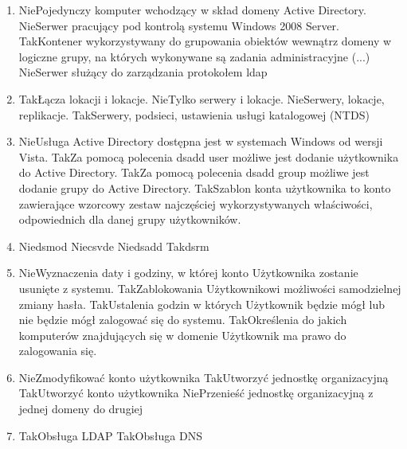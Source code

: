 \begin{enumerate}
		{Tak}{Dodać rolę Active Directory Domain Services.}%
		{Nie}{Zainstalować serwer DHCP.}
		\item {}%
		{Nie}{Pojedynczy komputer wchodzący w skład domeny Active Directory.}%
		{Nie}{Serwer pracujący pod kontrolą systemu Windows 2008 Server.}%
		{Tak}{Kontener wykorzystywany do grupowania obiektów wewnątrz domeny w logiczne grupy, na których wykonywane są zadania administracyjne (...)}%
		{Nie}{Serwer służący do zarządzania protokołem ldap}
		\item {}%
		{Tak}{Łącza lokacji i lokacje.}%
		{Nie}{Tylko serwery i lokacje.}%
		{Nie}{Serwery, lokacje, replikacje.}%
		{Tak}{Serwery, podsieci, ustawienia usługi katalogowej (NTDS)}
		\item {}%
		{Nie}{Usługa Active Directory dostępna jest w systemach Windows od wersji Vista.}%
		{Tak}{Za pomocą polecenia dsadd user możliwe jest dodanie użytkownika do Active Directory.}%
		{Tak}{Za pomocą polecenia dsadd group możliwe jest dodanie grupy do Active Directory.}%
		{Tak}{Szablon konta użytkownika to konto zawierające wzorcowy zestaw najczęściej wykorzystywanych właściwości, odpowiednich dla danej grupy użytkowników.}
		\item {}%
		{Nie}{dsmod}%
		{Nie}{csvde}%
		{Nie}{dsadd}%
		{Tak}{dsrm}
		\item {}%
		{Nie}{Wyznaczenia daty i godziny, w której konto Użytkownika zostanie usunięte z systemu.}%
		{Tak}{Zablokowania Użytkownikowi możliwości samodzielnej zmiany hasła.}%
		{Tak}{Ustalenia godzin w których Użytkownik będzie mógł lub nie będzie mógł zalogować się do systemu.}%
		{Tak}{Określenia do jakich komputerów znajdujących się w domenie Użytkownik ma prawo do zalogowania się.}
		\item {}%
		{Nie}{Zmodyfikować konto użytkownika}%
		{Tak}{Utworzyć jednostkę organizacyjną}%
		{Tak}{Utworzyć konto użytkownika}%
		{Nie}{Przenieść jednostkę organizacyjną z jednej domeny do drugiej}
		\item {}%
		{Tak}{Obsługa LDAP}%
		{Tak}{Obsługa DNS}%

\end{enumerate}
